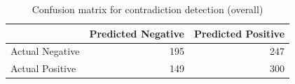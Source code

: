 \begin{table}
\caption{Confusion matrix for contradiction detection (overall)}
\label{tab:confusion_matrix}
\begin{tabular}{lrr}
\toprule
 & Predicted Negative & Predicted Positive \\
\midrule
Actual Negative & 195 & 247 \\
Actual Positive & 149 & 300 \\
\bottomrule
\end{tabular}
\end{table}
